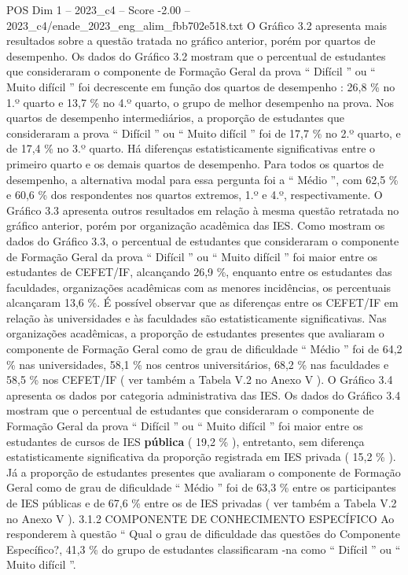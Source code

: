 \begin{textsample}{POS Dim 1 – 2023\_c4 – Score -2.00 – 2023\_c4/enade\_2023\_eng\_alim\_fbb702e518.txt}
O Gráfico 3.2 apresenta mais resultados sobre a questão tratada no gráfico anterior, porém por quartos de desempenho.
Os dados do Gráfico 3.2 mostram que o percentual de estudantes que consideraram o componente de Formação Geral da prova “ Difícil ” ou “ Muito difícil ” foi decrescente em função dos quartos de desempenho : 26,8 \% no 1.º quarto e 13,7 \% no 4.º quarto, o grupo de melhor desempenho na prova.
Nos quartos de desempenho intermediários, a proporção de estudantes que consideraram a prova “ Difícil ” ou “ Muito difícil ” foi de 17,7 \% no 2.º quarto, e de 17,4 \% no 3.º quarto.
Há diferenças estatisticamente significativas entre o primeiro quarto e os demais quartos de desempenho.
Para todos os quartos de desempenho, a alternativa modal para essa pergunta foi a “ Médio ”, com 62,5 \% e 60,6 \% dos respondentes nos quartos extremos, 1.º e 4.º, respectivamente.
O Gráfico 3.3 apresenta outros resultados em relação à mesma questão retratada no gráfico anterior, porém por organização acadêmica das IES.
Como mostram os dados do Gráfico 3.3, o percentual de estudantes que consideraram o componente de Formação Geral da prova “ Difícil ” ou “ Muito difícil ” foi maior entre os estudantes de CEFET/IF, alcançando 26,9 \%, enquanto entre os estudantes das faculdades, organizações acadêmicas com as menores incidências, os percentuais alcançaram 13,6 \%.
É possível observar que as diferenças entre os CEFET/IF em relação às universidades e às faculdades são estatisticamente significativas.
Nas organizações acadêmicas, a proporção de estudantes presentes que avaliaram o componente de Formação Geral como de grau de dificuldade “ Médio ” foi de 64,2 \% nas universidades, 58,1 \% nos centros universitários, 68,2 \% nas faculdades e 58,5 \% nos CEFET/IF ( ver também a Tabela V.2 no Anexo V ).
O Gráfico 3.4 apresenta os dados por categoria administrativa das IES.
Os dados do Gráfico 3.4 mostram que o percentual de estudantes que consideraram o componente de Formação Geral da prova “ Difícil ” ou “ Muito difícil ” foi maior entre os estudantes de cursos de IES \textbf{pública} ( 19,2 \% ), entretanto, sem diferença estatisticamente significativa da proporção registrada em IES privada ( 15,2 \% ).
Já a proporção de estudantes presentes que avaliaram o componente de Formação Geral como de grau de dificuldade “ Médio ” foi de 63,3 \% entre os participantes de IES públicas e de 67,6 \% entre os de IES privadas ( ver também a Tabela V.2 no Anexo V ). 3.1.2 COMPONENTE DE CONHECIMENTO ESPECÍFICO Ao responderem à questão “ Qual o grau de dificuldade das questões do Componente Específico?, 41,3 \% do grupo de estudantes classificaram -na como “ Difícil ” ou “ Muito difícil ”.

\end{textsample}
